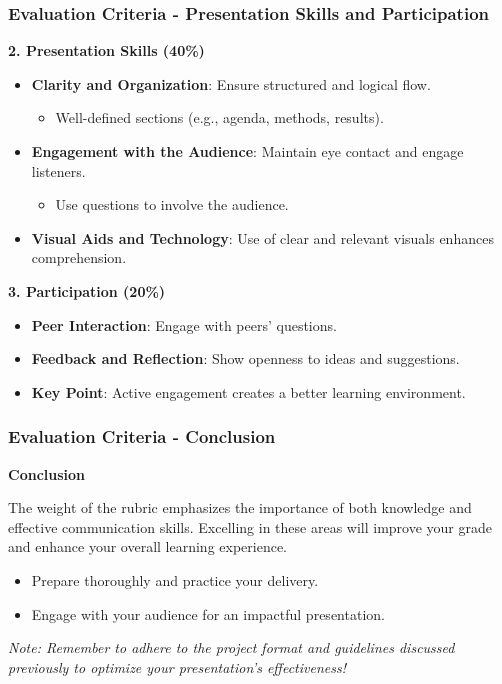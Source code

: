 \documentclass{beamer}
\begin{document}
\begin{frame}[fragile]
    \frametitle{Evaluation Criteria - Presentation Skills and Participation}
    \textbf{2. Presentation Skills (40\%)}
    
    \begin{itemize}
        \item \textbf{Clarity and Organization}: Ensure structured and logical flow.
        \begin{itemize}
            \item Well-defined sections (e.g., agenda, methods, results).
        \end{itemize}
        
        \item \textbf{Engagement with the Audience}: Maintain eye contact and engage listeners.
        \begin{itemize}
            \item Use questions to involve the audience.
        \end{itemize}
        
        \item \textbf{Visual Aids and Technology}: Use of clear and relevant visuals enhances comprehension.
    \end{itemize}
    
    \bigskip
    
    \textbf{3. Participation (20\%)}
    
    \begin{itemize}
        \item \textbf{Peer Interaction}: Engage with peers’ questions.
        
        \item \textbf{Feedback and Reflection}: Show openness to ideas and suggestions.
        
        \item \textbf{Key Point}: Active engagement creates a better learning environment.
    \end{itemize}
\end{frame}

\begin{frame}[fragile]
    \frametitle{Evaluation Criteria - Conclusion}
    \textbf{Conclusion}
    
    The weight of the rubric emphasizes the importance of both knowledge and effective communication skills. 
    Excelling in these areas will improve your grade and enhance your overall learning experience.
    
    \begin{itemize}
        \item Prepare thoroughly and practice your delivery.
        \item Engage with your audience for an impactful presentation.
    \end{itemize}
    
    \bigskip
    
    \textit{Note: Remember to adhere to the project format and guidelines discussed previously to optimize your presentation's effectiveness!}
\end{frame}
\end{document}
